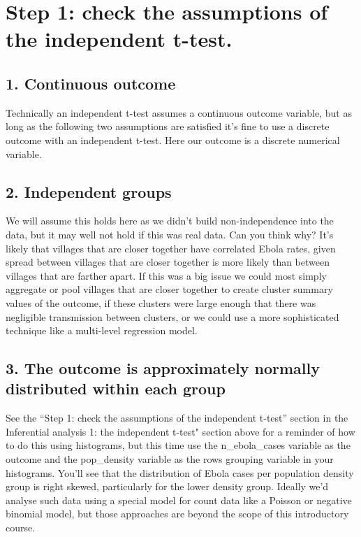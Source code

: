 \documentclass[
]{book}
\begin{document}
\hypertarget{step-1-check-the-assumptions-of-the-independent-t-test.}{%
\section{Step 1: check the assumptions of the independent t-test.}\label{step-1-check-the-assumptions-of-the-independent-t-test.}}

\hypertarget{continuous-outcome}{%
\subsection{1. Continuous outcome}\label{continuous-outcome}}

Technically an independent t-test assumes a continuous outcome variable, but as long as the following two assumptions are satisfied it's fine to use a discrete outcome with an independent t-test. Here our outcome is a discrete numerical variable.

\hypertarget{independent-groups}{%
\subsection{2. Independent groups}\label{independent-groups}}

We will assume this holds here as we didn't build non-independence into the data, but it may well not hold if this was real data. Can you think why? It's likely that villages that are closer together have correlated Ebola rates, given spread between villages that are closer together is more likely than between villages that are farther apart. If this was a big issue we could most simply aggregate or pool villages that are closer together to create cluster summary values of the outcome, if these clusters were large enough that there was negligible transmission between clusters, or we could use a more sophisticated technique like a multi-level regression model.

\hypertarget{the-outcome-is-approximately-normally-distributed-within-each-group}{%
\subsection{3. The outcome is approximately normally distributed within each group}\label{the-outcome-is-approximately-normally-distributed-within-each-group}}

See the ``Step 1: check the assumptions of the independent t-test'' section in the Inferential analysis 1: the independent t-test" section above for a reminder of how to do this using histograms, but this time use the n\_ebola\_cases variable as the outcome and the pop\_density variable as the rows grouping variable in your histograms. You'll see that the distribution of Ebola cases per population density group is right skewed, particularly for the lower density group. Ideally we'd analyse such data using a special model for count data like a Poisson or negative binomial model, but those approaches are beyond the scope of this introductory course.
\end{document}
